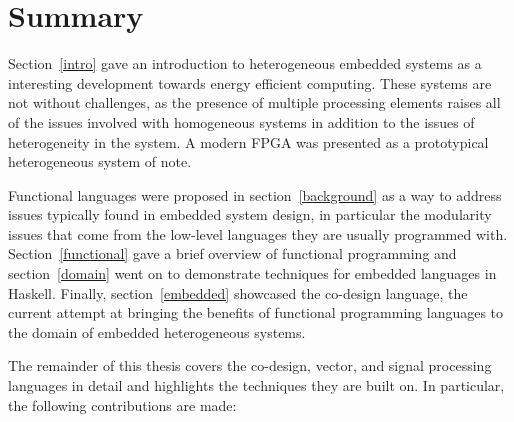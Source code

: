 \documentclass[../paper.tex]{subfiles}
\begin{document}
\section{Summary}

Section~\ref{intro} gave an introduction to heterogeneous embedded systems as a interesting development towards energy efficient computing. These systems are not without challenges, as the presence of multiple processing elements raises all of the issues involved with homogeneous systems in addition to the issues of heterogeneity in the system. A modern FPGA was presented as a prototypical heterogeneous system of note.

Functional languages were proposed in section~\ref{background} as a way to address issues typically found in embedded system design, in particular the modularity issues that come from the low-level languages they are usually programmed with. Section~\ref{functional} gave a brief overview of functional programming and section~\ref{domain} went on to demonstrate techniques for embedded languages in Haskell. Finally, section~\ref{embedded} showcased the co-design language, the current attempt at bringing the benefits of functional programming languages to the domain of embedded heterogeneous systems.

The remainder of this thesis covers the co-design, vector, and signal processing languages in detail and highlights the techniques they are built on. In particular, the following contributions are made:
\end{document}

